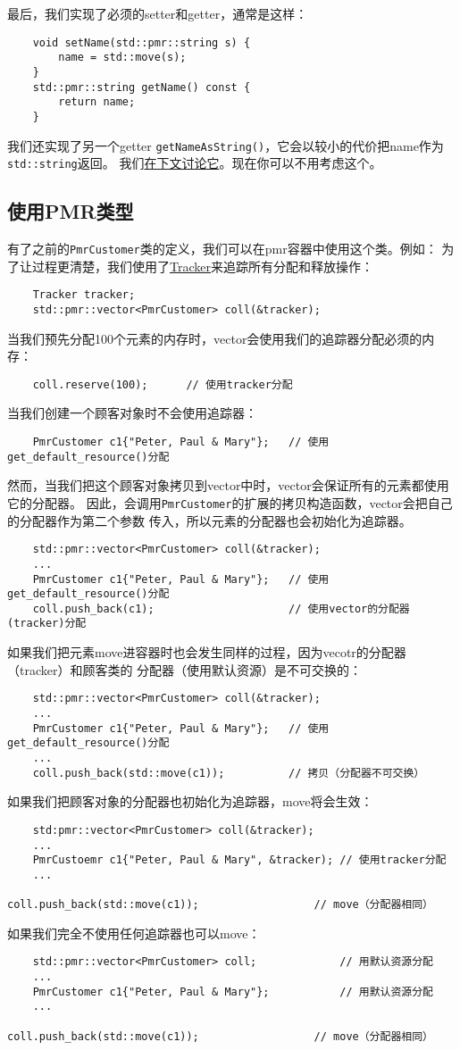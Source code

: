 最后，我们实现了必须的setter和getter，通常是这样：
\begin{lstlisting}
    void setName(std::pmr::string s) {
        name = std::move(s);
    }
    std::pmr::string getName() const {
        return name;
    }
\end{lstlisting}
我们还实现了另一个getter \texttt{getNameAsString()}，它会以较小的代价把name作为\texttt{std::string}返回。
我们\hyperref[pmr转换]{在下文讨论它}。现在你可以不用考虑这个。

\subsection{使用PMR类型}
有了之前的\texttt{PmrCustomer}类的定义，我们可以在pmr容器中使用这个类。例如：
为了让过程更清楚，我们使用了\hyperref[ch29.2]{Tracker}来追踪所有分配和释放操作：
\begin{lstlisting}
    Tracker tracker;
    std::pmr::vector<PmrCustomer> coll(&tracker);
\end{lstlisting}
当我们预先分配100个元素的内存时，vector会使用我们的追踪器分配必须的内存：
\begin{lstlisting}
    coll.reserve(100);      // 使用tracker分配
\end{lstlisting}
当我们创建一个顾客对象时不会使用追踪器：
\begin{lstlisting}
    PmrCustomer c1{"Peter, Paul & Mary"};   // 使用get_default_resource()分配
\end{lstlisting}
然而，当我们把这个顾客对象拷贝到vector中时，vector会保证所有的元素都使用它的分配器。
因此，会调用\texttt{PmrCustomer}的扩展的拷贝构造函数，vector会把自己的分配器作为第二个参数
传入，所以元素的分配器也会初始化为追踪器。
\begin{lstlisting}
    std::pmr::vector<PmrCustomer> coll(&tracker);
    ...
    PmrCustomer c1{"Peter, Paul & Mary"};   // 使用get_default_resource()分配
    coll.push_back(c1);                     // 使用vector的分配器(tracker)分配
\end{lstlisting}
如果我们把元素move进容器时也会发生同样的过程，因为vecotr的分配器（tracker）和顾客类的
分配器（使用默认资源）是不可交换的：
\begin{lstlisting}
    std::pmr::vector<PmrCustomer> coll(&tracker);
    ...
    PmrCustomer c1{"Peter, Paul & Mary"};   // 使用get_default_resource()分配
    ...
    coll.push_back(std::move(c1));          // 拷贝（分配器不可交换）
\end{lstlisting}
如果我们把顾客对象的分配器也初始化为追踪器，move将会生效：
\begin{lstlisting}
    std:pmr::vector<PmrCustomer> coll(&tracker);
    ...
    PmrCustoemr c1{"Peter, Paul & Mary", &tracker); // 使用tracker分配
    ...
    coll.push_back(std::move(c1));                  // move（分配器相同）
\end{lstlisting}
如果我们完全不使用任何追踪器也可以move：
\begin{lstlisting}
    std::pmr::vector<PmrCustomer> coll;             // 用默认资源分配
    ...
    PmrCustomer c1{"Peter, Paul & Mary"};           // 用默认资源分配
    ...
    coll.push_back(std::move(c1));                  // move（分配器相同）
\end{lstlisting}

